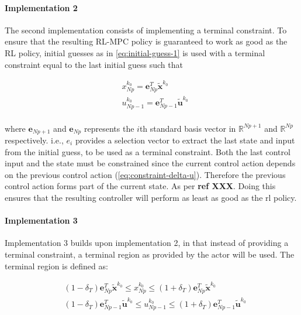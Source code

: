 \paragraph{Implementation 2}
The second implementation consists of implementing a terminal constraint. To ensure that the resulting RL-MPC policy is guaranteed to work as good as the RL policy, initial guesses as in \autoref{eq:initial-guess-1} is used with a terminal constraint equal to the last initial guess such that

\begin{equation}\label{eq:terminal-constraint-ocp}
	\begin{aligned}
		& x^{k_0}_{Np} = \mathbf{e}_{Np}^T \tilde{\mathbf{x}}^{k_0}\\
		& u^{k_0}_{Np-1} = \mathbf{e}_{Np-1}^T\tilde{\mathbf{u}}^{k_0}\\
	\end{aligned}
\end{equation}

where $\mathbf{e}_{Np+1}$ and $\mathbf{e}_{Np}$ represents the $i$th standard basis vector in $\mathbb{R}^{Np+1}$ and $\mathbb{R}^{Np}$ respectively. i.e., $e_i$ provides a selection vector to extract the last state and input from the initial guess, to be used as a terminal constraint. Both the last control input and the state must be constrained since the current control action depends on the previous control action (\autoref{eq:constraint-delta-u}). Therefore the previous control action forms part of the current state. As per \textbf{ref XXX}. Doing this ensures that the resulting controller will perform as least as good as the rl policy. 

\paragraph{Implementation 3}
Implementation 3 builds upon implementation 2, in that instead of providing a terminal constraint, a terminal region as provided by the actor will be used. The terminal region is defined as:

\begin{equation}\label{eq:terminal-constraint-ocp}
	\begin{aligned}
		& (1-\delta_T)\mathbf{e}_{Np}^T \tilde{\mathbf{x}}^{k_0} \leq x^{k_0}_{Np} \leq (1+\delta_T)\mathbf{e}_{Np}^T \tilde{\mathbf{x}}^{k_0}\\
		&(1-\delta_T)\mathbf{e}_{Np-1}^T\tilde{\mathbf{u}}^{k_0} \leq u^{k_0}_{Np-1} \leq (1+\delta_T) \mathbf{e}_{Np-1}^T\tilde{\mathbf{u}}^{k_0}\\
	\end{aligned}
\end{equation}

